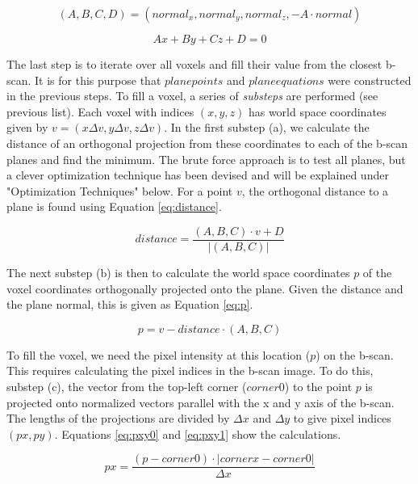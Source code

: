 \begin{equation}
\label{eq:pp2pe1}
	(A,B,C,D) = (normal_x, normal_y, normal_z, -A\cdot normal)
\end{equation}

\begin{equation}
\label{eq:plane_equation}
	Ax + By + Cz + D = 0
\end{equation}

The last step is to iterate over all voxels and fill their value from the closest b-scan. It is for this purpose that $planepoints$ and $planeequations$ were constructed in the previous steps. To fill a voxel, a series of \emph{substeps} are performed (see previous list). Each voxel with indices $(x,y,z)$ has world space coordinates given by $v = (x\Delta v,y\Delta v,z\Delta v)$. In the first substep (a), we calculate the distance of an orthogonal projection from these coordinates to each of the b-scan planes and find the minimum. The brute force approach is to test all planes, but a clever optimization technique has been devised and will be explained under "Optimization Techniques" below. For a point $v$, the orthogonal distance to a plane is found using Equation \ref{eq:distance}.

\begin{equation}
\label{eq:distance}
	distance = \frac{(A,B,C)\cdot v + D}{|(A,B,C)|}
\end{equation}

The next substep (b) is then to calculate the world space coordinates $p$ of the voxel coordinates orthogonally projected onto the plane. Given the distance and the plane normal, this is given as Equation \ref{eq:p}.

\begin{equation}
\label{eq:p}
	p = v - distance\cdot (A,B,C)
\end{equation}

To fill the voxel, we need the pixel intensity at this location ($p$) on the b-scan. This requires calculating the pixel indices in the b-scan image. To do this, substep (c), the vector from the top-left corner ($corner0$) to the point $p$ is projected onto normalized vectors parallel with the x and y axis of the b-scan. The lengths of the projections are divided by $\Delta x$ and $\Delta y$ to give pixel indices $(px,py)$. Equations \ref{eq:pxy0} and \ref{eq:pxy1} show the calculations.

\begin{equation}
\label{eq:pxy0}
	px = \frac{(p-corner0) \cdot |cornerx-corner0|}{\Delta x}
\end{equation}


